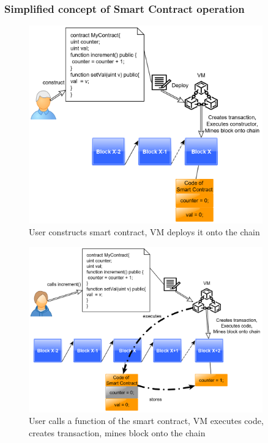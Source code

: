 \documentclass[a4paper]{article}
\begin{document}
\subsubsection{Simplified concept of Smart Contract operation}
\begin{figure}[H]
    \centering
    \includegraphics[width=0.9\textwidth]{figures/deploy_0.png}
    \caption{User constructs smart contract, VM deploys it onto the chain}
    \label{fig:deploy_0}
\end{figure}
\begin{figure}[H]
    \centering
    \includegraphics[width=0.9\textwidth]{figures/deploy_1.png}
    \caption{User calls a function of the smart contract, VM executes code, creates transaction, mines block onto the chain}
    \label{fig:deploy_1}
\end{figure}
\end{document}
